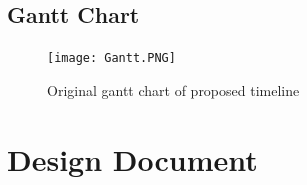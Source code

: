 \documentclass[onecolumn, draftclsnofoot,10pt, compsoc]{IEEEtran}
\begin{document}
\subsection{Gantt Chart}

\begin{figure}[!htb]
    \texttt{[image: Gantt.PNG]}
    \caption{Original gantt chart of proposed timeline}
    \label{fig:Gantt Chart}
\end{figure}


\section{Design Document}
\end{document}
